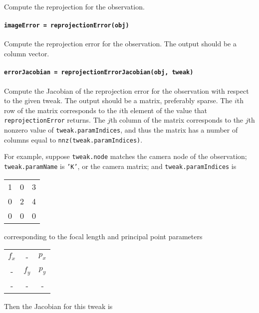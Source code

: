 Compute the reprojection for the observation.

\paragraph{\texttt{imageError = reprojectionError(obj)}}

Compute the reprojection error for the observation. The output should be a column vector.

\paragraph{\texttt{errorJacobian = reprojectionErrorJacobian(obj, tweak)}}

Compute the Jacobian of the reprojection error for the observation with respect to the given tweak.
The output should be a matrix, preferably sparse. 
The $i$th row of the matrix corresponds to the $i$th element of the value that 
\texttt{reprojectionError} returns. The $j$th column of the matrix corresponds to the $j$th
nonzero value of \texttt{tweak.paramIndices}, and thus the matrix has a number of columns
equal to \texttt{nnz(tweak.paramIndices)}. 

For example, suppose \texttt{tweak.node} matches the camera node of the observation;  
\texttt{tweak.paramName} is \texttt{'K'}, or the camera matrix;
and \texttt{tweak.paramIndices} is

\begin{center}\begin{tabular}{ccc}
    1 & 0 & 3 \\
    0 & 2 & 4 \\
    0 & 0 & 0
\end{tabular}\end{center}

corresponding to the focal length and principal point parameters

\begin{center}\begin{tabular}{ccc}
    $f_x$ & - & $p_x$ \\
    - & $f_y$ & $p_y$ \\
    - & - & -
\end{tabular}\end{center}

Then the Jacobian for this tweak is

